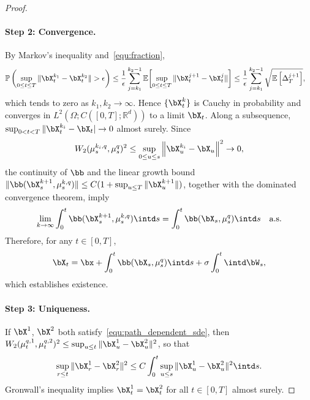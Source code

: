 \documentclass[a4paper,fleqn]{cas-sc}
\theoremstyle{definition}
\begin{document}
\begin{proof}
\paragraph{Step 2: Convergence.}
By Markov's inequality and~\eqref{equ:fraction},
\[
\begin{aligned}
 \mathbb P \left( \sup_{0\leq t\leq T} \|\bX_t^{k_1}-\bX_t^{k_2}\|>\epsilon \right)
 &\leq \frac{1}{\epsilon}\sum_{j=k_1}^{k_2-1}\mathbb E\!\left[\sup_{0\leq t\leq T} \|\bX_t^{j+1}-\bX_t^{j}\| \right]
 \leq  \frac{1}{\epsilon}\sum_{j=k_1}^{k_2-1}\sqrt{\mathbb E \left[\Delta_T^{j+1} \right]},
\end{aligned}
\]
which tends to zero as $k_1,k_2\to\infty$.
Hence $\{\bX^k_t\}$ is Cauchy in probability and converges in $L^2(\Omega;C([0,T];\mathbb R^{d}))$ to a limit $\bX_t$.
Along a subsequence, $\sup_{0<t<T}\|\bX^{k_i}_t-\bX_t| \to 0$ almost surely.
Since
\[
W_2(\mu_s^{k_i,q},\mu_s^{q})^2
\le
\sup_{0\le u\le s}\left\|\bX_u^{k_i}-\bX_u\right\|^2 \to 0,
\]
the continuity of $\bb$ and the linear growth bound $\|\bb(\bX_s^{k+1},\mu_s^{k,q})\|\leq C(1+\sup_{u\leq T}\|\bX_u^{k+1}\|)$, together with the dominated convergence theorem, imply
\[
\lim_{k\to\infty} \int_0^t \bb(\bX_s^{k+1},\mu_s^{k,q}) \intd s  = \int_0^t \bb(\bX_s ,\mu_s^{q} ) \intd s \quad \text{a.s.}
\]
Therefore, for any $t\in[0,T]$,
\[
\bX_t = \bx + \int_0^t \bb(\bX_s,\mu_s^q) \intd s + \sigma \int_0^t \intd \bW_s,
\]
which establishes existence.

\paragraph{Step 3: Uniqueness.}
If $\bX^1$, $\bX^2$ both satisfy~\eqref{equ:path_dependent_sde}, then
$W_2(\mu_{t}^{q,1},\mu_{t}^{q,2})^2\leq \sup_{u\le t} \|\bX^1_{u}-\bX^2_{u}\|^2$,
so that
\[
\sup_{r\le t} \|\bX^1_{r}-\bX^2_{r}\|^2\leq C \int_0^t \sup_{u\le s} \|\bX^1_{u}-\bX^2_{u}\|^2 \intd s.
\]
Gronwall's inequality implies $\bX^1_t = \bX^2_t$ for all $t\in [0,T]$ almost surely.
\end{proof}
\end{document}
